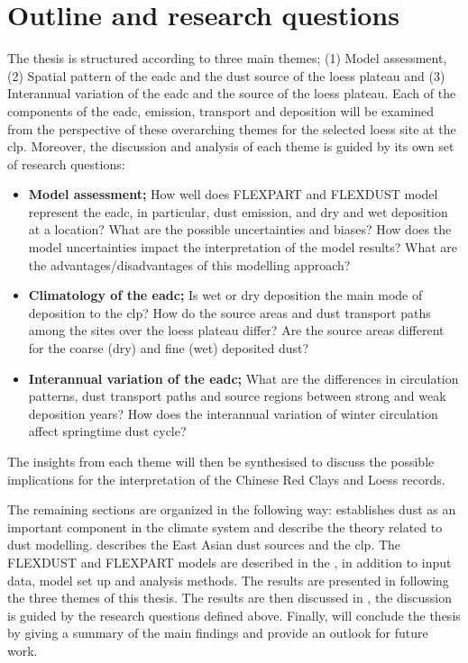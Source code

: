 \section{Outline and research questions}
The thesis is structured according to three main themes; (1) Model assessment, (2) Spatial pattern of the \acrshort{eadc} and the dust source of the loess plateau and (3) Interannual variation of the \acrshort{eadc} and the source of the loess plateau. Each of the components of the \acrshort{eadc}, emission, transport and deposition will be examined from the perspective of these overarching themes for the selected loess site at the \acrshort{clp}. Moreover, the discussion and analysis of each theme is guided by its own set of research questions: 
\begin{itemize}
    \item \textbf{Model assessment;} How well does FLEXPART and FLEXDUST model represent the \acrshort{eadc}, in particular, dust emission, and dry and wet deposition at a location? What are the possible uncertainties and biases? How does the model uncertainties impact the interpretation of the model results? What are the advantages/disadvantages of this modelling approach?
    \item \textbf{Climatology of the \acrshort{eadc};} Is wet or dry deposition the main mode of deposition to the \acrshort{clp}? How do the source areas and dust transport paths among the sites over the loess plateau differ? Are the source areas different for the coarse (dry) and fine (wet) deposited dust? 
    \item \textbf{Interannual variation of the \acrshort{eadc};} What are the differences in circulation patterns, dust transport paths and source regions between strong and weak deposition years? How does the interannual variation of winter circulation affect springtime dust cycle? 
\end{itemize}
The insights from each theme will then be synthesised to discuss the possible implications for the interpretation of the Chinese Red Clays and Loess records. 

The remaining sections are organized in the following way: 
 establishes dust as an important component in the climate system and describe the theory related to dust modelling. 
 describes the East Asian dust sources and the \acrshort{clp}. 
The FLEXDUST and FLEXPART models are described in the , in addition to input data, model set up and analysis methods. The results are presented in  following the three themes of this thesis. 
The results are then discussed in , the discussion is guided by the research questions defined above. Finally,  will conclude the thesis by giving a summary of the main findings and provide an outlook for future work. 
